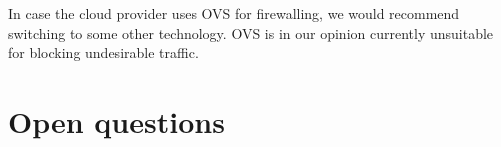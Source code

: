 In case the cloud provider uses OVS for firewalling, we would recommend switching to some other technology. OVS is in our opinion currently unsuitable for blocking undesirable traffic.

\section{Open questions}


